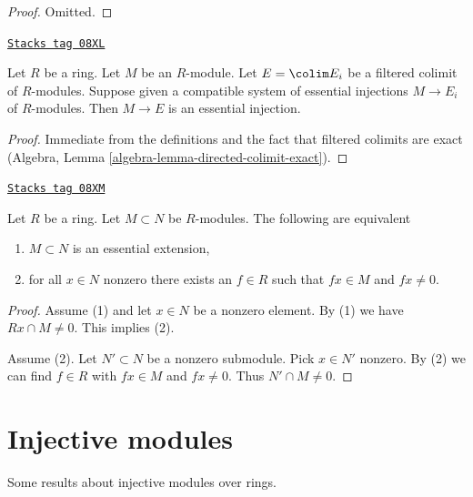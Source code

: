 \begin{proof}
Omitted.
\end{proof}

\begin{lemma}
\label{dualizing-lemma-union-essential-extensions}
\href{https://stacks.math.columbia.edu/tag/08XL}{\texttt{Stacks tag 08XL}}

Let $R$ be a ring. Let $M$ be an $R$-module. Let $E = \colim E_i$
be a filtered colimit of $R$-modules. Suppose given a compatible
system of essential injections $M \to E_i$ of $R$-modules.
Then $M \to E$ is an essential injection.
\end{lemma}

\begin{proof}
Immediate from the definitions and the fact that filtered
colimits are exact (Algebra, Lemma \ref{algebra-lemma-directed-colimit-exact}).
\end{proof}

\begin{lemma}
\label{dualizing-lemma-essential-extension}
\href{https://stacks.math.columbia.edu/tag/08XM}{\texttt{Stacks tag 08XM}}

Let $R$ be a ring. Let $M \subset N$ be $R$-modules. The following
are equivalent
\begin{enumerate}
\item $M \subset N$ is an essential extension,
\item for all $x \in N$ nonzero there exists an $f \in R$ such that $fx \in M$
and $fx \not = 0$.
\end{enumerate}
\end{lemma}

\begin{proof}
Assume (1) and let $x \in N$ be a nonzero element. By (1) we have
$Rx \cap M \not = 0$. This implies (2).

\medskip\noindent
Assume (2). Let $N' \subset N$ be a nonzero submodule. Pick $x \in N'$
nonzero. By (2) we can find $f \in R$ with $fx \in M$ and $fx \not = 0$.
Thus $N' \cap M \not = 0$.
\end{proof}

\section{Injective modules}
\label{dualizing-section-injective-modules}
Some results about injective modules over rings.

